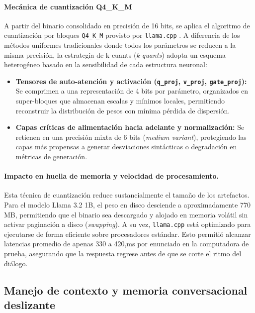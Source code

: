 \paragraph{Mecánica de cuantización Q4\_K\_M}
A partir del binario consolidado en precisión de 16 bits, se aplica el algoritmo de cuantización por bloques \texttt{Q4\_K\_M} provisto por \texttt{llama.cpp} \parencite{gerganov2023llamacpp, frantar2022gptq}. A diferencia de los métodos uniformes tradicionales donde todos los parámetros se reducen a la misma precisión, la estrategia de k-cuants (\textit{k-quants}) adopta un esquema heterogéneo basado en la sensibilidad de cada estructura neuronal:
\begin{itemize}
    \item \textbf{Tensores de auto-atención y activación (\texttt{q\_proj}, \texttt{v\_proj}, \texttt{gate\_proj}):} Se comprimen a una representación de 4 bits por parámetro, organizados en super-bloques que almacenan escalas y mínimos locales, permitiendo reconstruir la distribución de pesos con mínima pérdida de dispersión.
    \item \textbf{Capas críticas de alimentación hacia adelante y normalización:} Se retienen en una precisión mixta de 6 bits (\textit{medium variant}), protegiendo las capas más propensas a generar desviaciones sintácticas o degradación en métricas de generación.
\end{itemize}

\paragraph{Impacto en huella de memoria y velocidad de procesamiento.}
Esta técnica de cuantización reduce sustancialmente el tamaño de los artefactos. Para el modelo Llama 3.2 1B, el peso en disco desciende a aproximadamente 770\,MB, permitiendo que el binario sea descargado y alojado en memoria volátil sin activar paginación a disco (\textit{swapping}). A su vez, \texttt{llama.cpp} está optimizado para ejecutarse de forma eficiente sobre procesadores estándar. Esto permitió alcanzar latencias promedio de apenas 330 a 420,ms por enunciado en la computadora de prueba, asegurando que la respuesta regrese antes de que se corte el ritmo del diálogo.

\subsection{Manejo de contexto y memoria conversacional deslizante}

